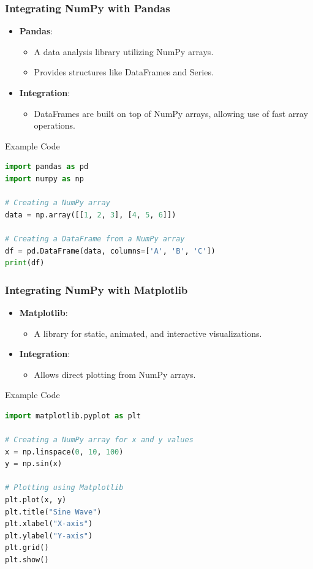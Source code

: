 \documentclass{beamer}
\begin{document}
\begin{frame}[fragile]
    \frametitle{Integrating NumPy with Pandas}
    \begin{itemize}
        \item \textbf{Pandas}:
        \begin{itemize}
            \item A data analysis library utilizing NumPy arrays.
            \item Provides structures like DataFrames and Series.
        \end{itemize}

        \item \textbf{Integration}:
        \begin{itemize}
            \item DataFrames are built on top of NumPy arrays, allowing use of fast array operations.
        \end{itemize}
    \end{itemize}

    \begin{block}{Example Code}
    \begin{lstlisting}[language=Python]
import pandas as pd
import numpy as np

# Creating a NumPy array
data = np.array([[1, 2, 3], [4, 5, 6]])

# Creating a DataFrame from a NumPy array
df = pd.DataFrame(data, columns=['A', 'B', 'C'])
print(df)
    \end{lstlisting}
    \end{block}
\end{frame}

\begin{frame}[fragile]
    \frametitle{Integrating NumPy with Matplotlib}
    \begin{itemize}
        \item \textbf{Matplotlib}:
        \begin{itemize}
            \item A library for static, animated, and interactive visualizations.
        \end{itemize}

        \item \textbf{Integration}:
        \begin{itemize}
            \item Allows direct plotting from NumPy arrays.
        \end{itemize}
    \end{itemize}

    \begin{block}{Example Code}
    \begin{lstlisting}[language=Python]
import matplotlib.pyplot as plt

# Creating a NumPy array for x and y values
x = np.linspace(0, 10, 100)
y = np.sin(x)

# Plotting using Matplotlib
plt.plot(x, y)
plt.title("Sine Wave")
plt.xlabel("X-axis")
plt.ylabel("Y-axis")
plt.grid()
plt.show()
    \end{lstlisting}
    \end{block}
\end{frame}
\end{document}
